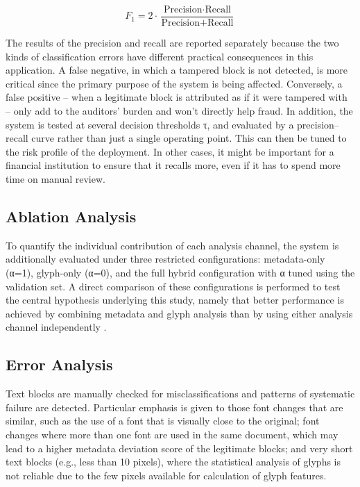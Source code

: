 \begin{equation}
F_1 = 2 \cdot \frac{\text{Precision} \cdot \text{Recall}}{\text{Precision} + \text{Recall}}
\end{equation}

\noindent The results of the precision and recall are reported separately because the two kinds of classification errors have different practical consequences in this application. A false negative, in which a tampered block is not detected, is more critical since the primary purpose of the system is being affected. Conversely, a false positive – when a legitimate block is attributed as if it were tampered with – only add to the auditors' burden and won't directly help fraud. In addition, the system is tested at several decision thresholds τ, and evaluated by a precision--recall curve rather than just a single operating point. This can then be tuned to the risk profile of the deployment. In other cases, it might be important for a financial institution to ensure that it recalls more, even if it has to spend more time on manual review.

\subsection{Ablation Analysis}

To quantify the individual contribution of each analysis channel, the system is additionally evaluated under three restricted configurations: metadata-only (α=1), glyph-only (α=0), and the full hybrid configuration with α tuned using the validation set. A direct comparison of these configurations is performed to test the central hypothesis underlying this study, namely that better performance is achieved by combining metadata and glyph analysis than by using either analysis channel independently \cite{Chen2022FontForgery,Zhang2023PDFLayout}.

\subsection{Error Analysis}

Text blocks are manually checked for misclassifications and patterns of systematic failure are detected. Particular emphasis is given to those font changes that are similar, such as the use of a font that is visually close to the original; font changes where more than one font are used in the same document, which may lead to a higher metadata deviation score of the legitimate blocks; and very short text blocks (e.g., less than 10 pixels), where the statistical analysis of glyphs is not reliable due to the few pixels available for calculation of glyph features.

